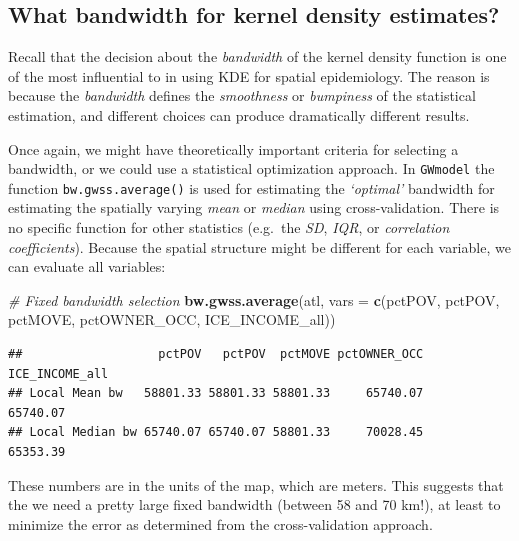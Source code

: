 \documentclass[
]{book}
\newenvironment{Shaded}{\begin{snugshade}}{\end{snugshade}}
\newcommand{\AttributeTok}[1]{\textcolor[rgb]{0.13,0.29,0.53}{#1}}
\newcommand{\CommentTok}[1]{\textcolor[rgb]{0.56,0.35,0.01}{\textit{#1}}}
\newcommand{\FunctionTok}[1]{\textcolor[rgb]{0.13,0.29,0.53}{\textbf{#1}}}
\newcommand{\NormalTok}[1]{#1}
\newcommand{\StringTok}[1]{\textcolor[rgb]{0.31,0.60,0.02}{#1}}
\begin{document}
\hypertarget{what-bandwidth-for-kernel-density-estimates}{%
\subsection{What bandwidth for kernel density estimates?}\label{what-bandwidth-for-kernel-density-estimates}}

Recall that the decision about the \emph{bandwidth} of the kernel density function is one of the most influential to in using KDE for spatial epidemiology. The reason is because the \emph{bandwidth} defines the \emph{smoothness} or \emph{bumpiness} of the statistical estimation, and different choices can produce dramatically different results.

Once again, we might have theoretically important criteria for selecting a bandwidth, or we could use a statistical optimization approach. In \texttt{GWmodel} the function \texttt{bw.gwss.average()} is used for estimating the \emph{`optimal'} bandwidth for estimating the spatially varying \emph{mean} or \emph{median} using cross-validation. There is no specific function for other statistics (e.g.~the \emph{SD}, \emph{IQR}, or \emph{correlation coefficients}). Because the spatial structure might be different for each variable, we can evaluate all variables:

\begin{Shaded}
\begin{Highlighting}[]
\CommentTok{\# Fixed bandwidth selection}
\FunctionTok{bw.gwss.average}\NormalTok{(atl, }\AttributeTok{vars =} \FunctionTok{c}\NormalTok{(}\StringTok{\textquotesingle{}pctPOV\textquotesingle{}}\NormalTok{, }\StringTok{\textquotesingle{}pctPOV\textquotesingle{}}\NormalTok{, }\StringTok{\textquotesingle{}pctMOVE\textquotesingle{}}\NormalTok{, }
                              \StringTok{\textquotesingle{}pctOWNER\_OCC\textquotesingle{}}\NormalTok{, }\StringTok{\textquotesingle{}ICE\_INCOME\_all\textquotesingle{}}\NormalTok{))}
\end{Highlighting}
\end{Shaded}

\begin{verbatim}
##                   pctPOV   pctPOV  pctMOVE pctOWNER_OCC ICE_INCOME_all
## Local Mean bw   58801.33 58801.33 58801.33     65740.07       65740.07
## Local Median bw 65740.07 65740.07 58801.33     70028.45       65353.39
\end{verbatim}

These numbers are in the units of the map, which are meters. This suggests that the we need a pretty large fixed bandwidth (between 58 and 70 km!), at least to minimize the error as determined from the cross-validation approach.
\end{document}
